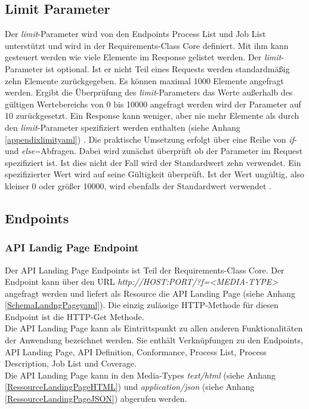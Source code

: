 \subsection{Limit Parameter}
Der \textit{limit}-Parameter wird von den Endpoints Process List und Job List unterstützt
und wird in der Requirements-Class Core definiert. Mit ihm kann gesteuert werden wie viele Elemente im Response gelistet werden. 
Der \textit{limit}-Parameter ist optional. Ist er nicht Teil eines Requests werden standardmäßig zehn Elemente zurückgegeben. Es können maximal 1000 Elemente angefragt werden.
Ergibt die Überprüfung des \textit{limit}-Parameters das Werte außerhalb des gültigen Wertebereichs von 0 bis 10000 angefragt werden wird der Parameter auf 10 zurückgesetzt. 
Ein Response kann weniger, aber nie mehr Elemente als durch den \textit{limit}-Parameter spezifiziert werden enthalten (siehe Anhang \ref{appendixlimityaml}) 
\cite{ogc_api_processes_core}. Die praktische Umsetzung erfolgt über eine Reihe von \textit{if}- und \textit{else-}-Abfragen. Dabei wird zunächst überprüft ob 
der Parameter im Request spezifiziert ist. Ist dies nicht der Fall wird der Standardwert zehn verwendet. Ein spezifizierter Wert wird auf seine Gültigkeit überprüft. 
Ist der Wert ungültig, also kleiner 0 oder größer 10000, wird ebenfalls der Standardwert verwendet \cite{ogc_api_processes_core}.

\subsection{Endpoints}
\subsubsection{API Landig Page Endpoint}
Der API Landing Page Endpoints ist Teil der Requirements-Class Core.
Der Endpoint kann über den URL \textit{http://HOST:PORT/?f=<MEDIA-TYPE>} angefragt werden und liefert als Resource die 
API Landing Page (siehe Anhang \ref{SchemaLandngPageyaml}). 
Die einzig zulässige HTTP-Methode für diesen Endpoint ist die HTTP-Get Methode.\\ 
Die API Landing Page kann als Eintrittspunkt zu allen anderen Funktionalitäten der Anwendung bezeichnet werden. Sie enthält Verknüpfungen zu den Endpoints, 
API Landing Page, API Definition, Conformance, Process List, Process Description, Job List und Coverage.\\
Die API Landing Page kann in den Media-Types \textit{text/html} (siehe Anhang \ref{RessourceLandingPageHTML}) und \textit{application/json} 
(siehe Anhang \ref{RessourceLandingPageJSON}) abgerufen werden. \\

